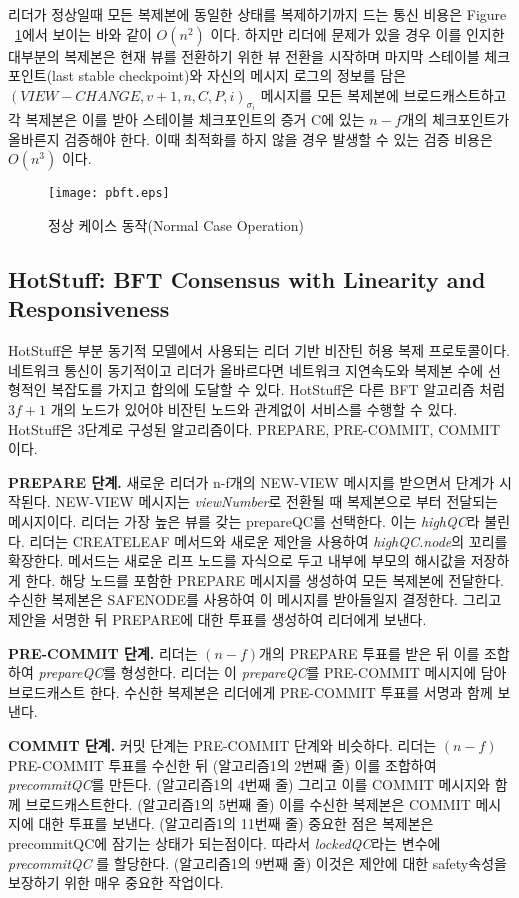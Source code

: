 \documentclass[table,smallextended]{svjour3}       %
\begin{document}
리더가 정상일때 모든 복제본에 동일한 상태를 복제하기까지 드는 통신
비용은 Figure ~\ref{fig:1}에서 보이는 바와 같이 \(O(n^{2})\) 이다.
하지만 리더에 문제가 있을 경우 이를 인지한 대부분의 복제본은 현재 뷰를 전환하기 위한 뷰 전환을 시작하며
마지막 스테이블 체크포인트(last stable checkpoint)와 자신의 메시지 로그의 정보를 담은 
\((VIEW-CHANGE,v+1,n,C,P,i)_{\sigma_{i}}\) 메시지를 모든 복제본에 브로드캐스트하고 
각 복제본은 이를 받아 스테이블 체크포인트의 증거 C에 있는 \(n-f\)개의 체크포인트가 올바른지 검증해야 한다.
이때 최적화를 하지 않을 경우 발생할 수 있는 검증 비용은 \(O(n^{3})\) 이다.

\begin{figure}
  \texttt{[image: pbft.eps]}
\caption{정상 케이스 동작(Normal Case Operation)}
\label{fig:1}       %
\end{figure}

\subsection{HotStuff: BFT Consensus with Linearity and Responsiveness}
HotStuff\cite{yin2019hotstuff}은 부분 동기적 모델에서 사용되는 리더 기반 비잔틴 허용 복제 프로토콜이다.
네트워크 통신이 동기적이고 리더가 올바르다면 네트워크 지연속도와 복제본 수에 선형적인 복잡도를 가지고
합의에 도달할 수 있다. HotStuff은 다른 BFT 알고리즘 처럼 \(3f+1\) 개의 노드가 있어야 비잔틴 노드와 관계없이
서비스를 수행할 수 있다. HotStuff은 3단계로 구성된 알고리즘이다. PREPARE, PRE-COMMIT, COMMIT이다.

\textbf{PREPARE 단계.} 새로운 리더가 n-f개의 NEW-VIEW 메시지를 받으면서 단계가 시작된다. 
NEW-VIEW 메시지는 \textit{viewNumber}로 전환될 때 복제본으로 부터 전달되는 메시지이다.
리더는 가장 높은 뷰를 갖는 prepareQC를 선택한다. 이는 \textit{highQC}라 불린다. 리더는 CREATELEAF 메서드와
새로운 제안을 사용하여 \textit{highQC.node}의 꼬리를 확장한다. 메서드는 새로운 리프 노드를 자식으로 두고
내부에 부모의 해시값을 저장하게 한다. 해당 노드를 포함한 PREPARE 메시지를 생성하여 모든 복제본에 전달한다.
수신한 복제본은 SAFENODE를 사용하여 이 메시지를 받아들일지 결정한다. 그리고 제안을 서명한 뒤
PREPARE에 대한 투표를 생성하여 리더에게 보낸다.

\textbf{PRE-COMMIT 단계.} 리더는 \((n-f)\)개의 PREPARE 투표를 받은 뒤 이를 조합하여 \textit{prepareQC}를
형성한다. 리더는 이 \textit{prepareQC}를 PRE-COMMIT 메시지에 담아 브로드캐스트 한다. 수신한 복제본은 리더에게
PRE-COMMIT 투표를 서명과 함께 보낸다.

\textbf{COMMIT 단계.} 커밋 단계는 PRE-COMMIT 단계와 비슷하다. 리더는 \((n-f)\) PRE-COMMIT 투표를 수신한 뒤
(알고리즘1의 2번째 줄)
이를 조합하여 \textit{precommitQC}를 만든다. (알고리즘1의 4번째 줄) 그리고 이를 COMMIT 메시지와 함께 브로드캐스트한다. 
(알고리즘1의 5번째 줄)
이를 수신한 복제본은 COMMIT 메시지에 대한 투표를 보낸다. (알고리즘1의 11번째 줄) 중요한 점은 복제본은 precommitQC에 잠기는 상태가 되는점이다.
따라서 \textit{lockedQC}라는 변수에 \textit{precommitQC} 를 할당한다. (알고리즘1의 9번째 줄) 이것은 제안에 대한 safety속성을 보장하기 위한
매우 중요한 작업이다.
\end{document}

